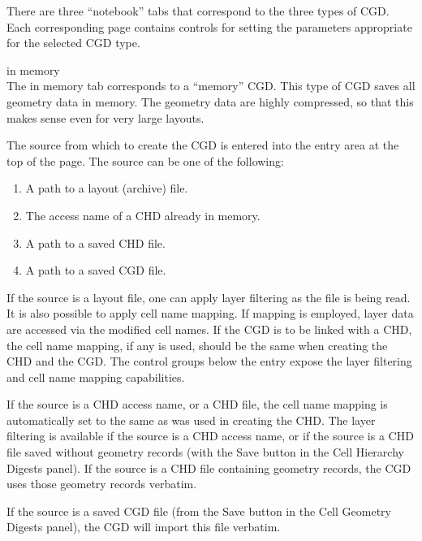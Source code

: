 There are three ``notebook'' tabs that correspond to the three types
of CGD.  Each corresponding page contains controls for setting the
parameters appropriate for the selected CGD type.

\begin{description}
\item{\cb in memory}\\
The {\cb in memory} tab corresponds to a ``memory'' CGD.  This type of
CGD saves all geometry data in memory.  The geometry data are highly
compressed, so that this makes sense even for very large layouts.

The source from which to create the CGD is entered into the entry area
at the top of the page.  The source can be one of the following:

\begin{enumerate}
\item{A path to a layout (archive) file.}\\
\item{The access name of a CHD already in memory.}\\
\item{A path to a saved CHD file.}\\
\item{A path to a saved CGD file.}\\
\end{enumerate}

If the source is a layout file, one can apply layer filtering as the
file is being read.  It is also possible to apply cell name mapping. 
If mapping is employed, layer data are accessed via the modified cell
names.  If the CGD is to be linked with a CHD, the cell name mapping,
if any is used, should be the same when creating the CHD and the CGD. 
The control groups below the entry expose the layer filtering and
cell name mapping capabilities.

If the source is a CHD access name, or a CHD file, the cell name
mapping is automatically set to the same as was used in creating the
CHD.  The layer filtering is available if the source is a CHD access
name, or if the source is a CHD file saved without geometry records
(with the {\cb Save} button in the {\cb Cell Hierarchy Digests}
panel).  If the source is a CHD file containing geometry records, the
CGD uses those geometry records verbatim.

If the source is a saved CGD file (from the {\cb Save} button in the
{\cb Cell Geometry Digests} panel), the CGD will import this file
verbatim.


\end{description}
